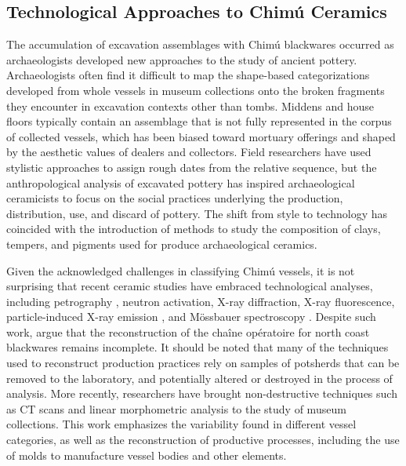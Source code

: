 \documentclass[]{interact}
\theoremstyle{plain}%
\theoremstyle{definition}
\theoremstyle{remark}
\begin{document}
\hypertarget{technological-approaches-to-chimuxfa-ceramics}{%
\subsection{Technological Approaches to Chimú
Ceramics}\label{technological-approaches-to-chimuxfa-ceramics}}

The accumulation of excavation assemblages with Chimú blackwares
occurred as archaeologists developed new approaches to the study of
ancient pottery. Archaeologists often find it difficult to map the
shape-based categorizations developed from whole vessels in museum
collections onto the broken fragments they encounter in excavation
contexts other than tombs. Middens and house floors typically contain an
assemblage that is not fully represented in the corpus of collected
vessels, which has been biased toward mortuary offerings and shaped by
the aesthetic values of dealers and collectors. Field researchers have
used stylistic approaches to assign rough dates from the relative
sequence, but the anthropological analysis of excavated pottery has
inspired archaeological ceramicists to focus on the social practices
underlying the production, distribution, use, and discard of pottery.
The shift from style to technology has coincided with the introduction
of methods to study the composition of clays, tempers, and pigments used
for produce archaeological ceramics.

Given the acknowledged challenges in classifying Chimú vessels, it is
not surprising that recent ceramic studies have embraced technological
analyses, including petrography \citep{RN11171}, neutron activation,
X-ray diffraction, X-ray fluorescence, particle-induced X-ray emission
\citep{RN11172}, and Mössbauer spectroscopy \citep{RN11173}. Despite
such work, \citet{RN11174} argue that the reconstruction of the chaîne
opératoire for north coast blackwares remains incomplete. It should be
noted that many of the techniques used to reconstruct production
practices rely on samples of potsherds that can be removed to the
laboratory, and potentially altered or destroyed in the process of
analysis. More recently, researchers have brought non-destructive
techniques such as CT scans \citep{RN11175} and linear morphometric
analysis \citep{RN11159} to the study of museum collections. This work
emphasizes the variability found in different vessel categories, as well
as the reconstruction of productive processes, including the use of
molds to manufacture vessel bodies and other elements.
\end{document}
